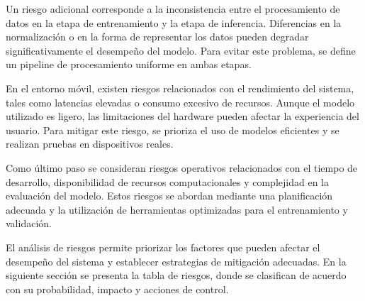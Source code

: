 	Un riesgo adicional corresponde a la inconsistencia entre el procesamiento de datos en la etapa de entrenamiento y la etapa de inferencia. Diferencias en la normalización o en la forma de representar los datos pueden degradar significativamente el desempeño del modelo. Para evitar este problema, se define un pipeline de procesamiento uniforme en ambas etapas.
	
	En el entorno móvil, existen riesgos relacionados con el rendimiento del sistema, tales como latencias elevadas o consumo excesivo de recursos. Aunque el modelo utilizado es ligero, las limitaciones del hardware pueden afectar la experiencia del usuario. Para mitigar este riesgo, se prioriza el uso de modelos eficientes y se realizan pruebas en dispositivos reales.
	
	Como último paso se consideran riesgos operativos relacionados con el tiempo de desarrollo, disponibilidad de recursos computacionales y complejidad en la evaluación del modelo. Estos riesgos se abordan mediante una planificación adecuada y la utilización de herramientas optimizadas para el entrenamiento y validación.
	
	El análisis de riesgos permite priorizar los factores que pueden afectar el desempeño del sistema y establecer estrategias de mitigación adecuadas. En la siguiente sección se presenta la tabla de riesgos, donde se clasifican de acuerdo con su probabilidad, impacto y acciones de control.
	
	
	\small
	\renewcommand{\arraystretch}{1.15}
	
